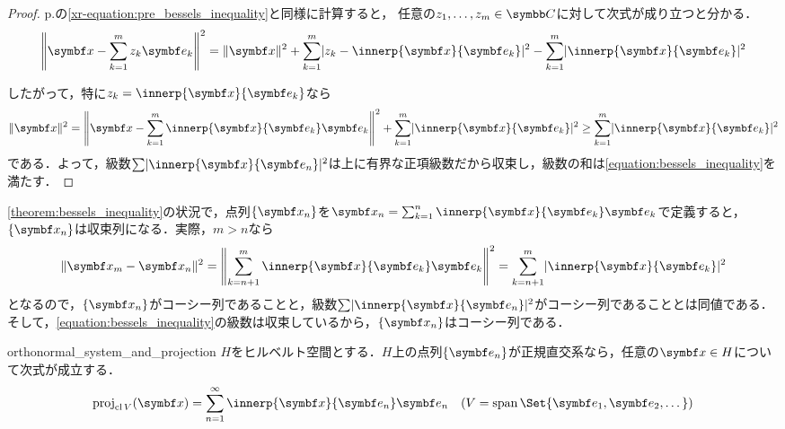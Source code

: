 \documentclass[../../main]{subfiles}
\begin{document}
\begin{proof}
  p.\pageref{xr-equation:pre_bessels_inequality}の\cref{xr-equation:pre_bessels_inequality}と同様に計算すると，
  任意の\(z_1,\dots,z_m\in\numset{C}\)に対して次式が成り立つと分かる．
  \[
    \vnorm*{\vect{x}-\sum_{k=1}^mz_k\vect{e}_k}^2 = \vnorm{\vect{x}}^2+\sum_{k=1}^m\abs{z_k-\innerp{\vect{x}}{\vect{e}_k}}^2-\sum_{k=1}^m\abs{\innerp{\vect{x}}{\vect{e}_k}}^2
  \]

  したがって，特に\(z_k=\innerp{\vect{x}}{\vect{e}_k}\)なら
  \[
    \vnorm{\vect{x}}^2 = \vnorm*{\vect{x}-\sum_{k=1}^m\innerp{\vect{x}}{\vect{e}_k}\vect{e}_k}^2+\sum_{k=1}^m\abs{\innerp{\vect{x}}{\vect{e}_k}}^2
    \geq \sum_{k=1}^m\abs{\innerp{\vect{x}}{\vect{e}_k}}^2
  \]
  である．よって，級数\(\sum\abs{\innerp{\vect{x}}{\vect{e}_n}}^2\)は上に有界な正項級数だから収束し，級数の和は\cref{equation:bessels_inequality}を満たす．
\end{proof}

\cref{theorem:bessels_inequality}の状況で，点列\(\seq{\vect{x}_n}\)を\(\vect{x}_n=\sum_{k=1}^n\innerp{\vect{x}}{\vect{e}_k}\vect{e}_k\)で定義すると，
\(\seq{\vect{x}_n}\)は収束列になる．実際，\(m>n\)なら
\[
  \vnorm{\vect{x}_m-\vect{x}_n}^2 = \vnorm*{\sum_{k=n+1}^m\innerp{\vect{x}}{\vect{e}_k}\vect{e}_k}^2
  = \sum_{k=n+1}^m\abs{\innerp{\vect{x}}{\vect{e}_k}}^2
\]
となるので，\(\seq{\vect{x}_n}\)がコーシー列であることと，級数\(\sum\abs{\innerp{\vect{x}}{\vect{e}_n}}^2\)がコーシー列であることとは同値である．
そして，\cref{equation:bessels_inequality}の級数は収束しているから，\(\seq{\vect{x}_n}\)はコーシー列である．

\begin{proposition}{}{orthonormal_system_and_projection}
  \(H\)をヒルベルト空間とする．\(H\)上の点列\(\seq{\vect{e}_n}\)が正規直交系なら，任意の\(\vect{x}\in H\)について次式が成立する．
  \[
    \proj_{\clsr V}(\vect{x}) = \sum_{n=1}^\infty\innerp{\vect{x}}{\vect{e}_n}\vect{e}_n
    \quad(V=\spannedby\Set{\vect{e}_1,\vect{e}_2,\dotsc})
  \]
\end{proposition}
\end{document}
